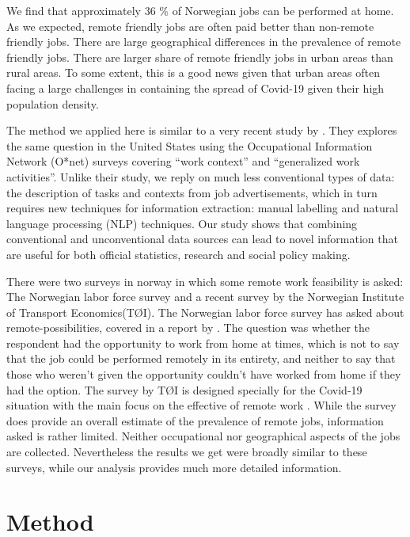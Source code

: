 \documentclass[11pt,]{article}
\begin{document}
We find that approximately 36 \% of Norwegian jobs can be performed at
home. As we expected, remote friendly jobs are often paid better than
non-remote friendly jobs. There are large geographical differences in
the prevalence of remote friendly jobs. There are larger share of remote
friendly jobs in urban areas than rural areas. To some extent, this is a
good news given that urban areas often facing a large challenges in
containing the spread of Covid-19 given their high population density.

The method we applied here is similar to a very recent study by
\citep{Dingel2020}. They explores the same question in the United States
using the Occupational Information Network (O*net) surveys covering
``work context'' and ``generalized work activities''. Unlike their
study, we reply on much less conventional types of data: the description
of tasks and contexts from job advertisements, which in turn requires
new techniques for information extraction: manual labelling and natural
language processing (NLP) techniques. Our study shows that combining
conventional and unconventional data sources can lead to novel
information that are useful for both official statistics, research and
social policy making.

There were two surveys in norway in which some remote work feasibility
is asked: The Norwegian labor force survey and a recent survey by the
Norwegian Institute of Transport Economics(TØI). The Norwegian labor
force survey has asked about remote-possibilities, covered in a report
by \citep{Nergaard2018}. The question was whether the respondent had the
opportunity to work from home at times, which is not to say that the job
could be performed remotely in its entirety, and neither to say that
those who weren't given the opportunity couldn't have worked from home
if they had the option. The survey by TØI is designed specially for the
Covid-19 situation with the main focus on the effective of remote work
\citep{Nordbakke2020}. While the survey does provide an overall estimate
of the prevalence of remote jobs, information asked is rather limited.
Neither occupational nor geographical aspects of the jobs are collected.
Nevertheless the results we get were broadly similar to these surveys,
while our analysis provides much more detailed information.

\hypertarget{method}{%
\section{Method}\label{method}}
\end{document}
